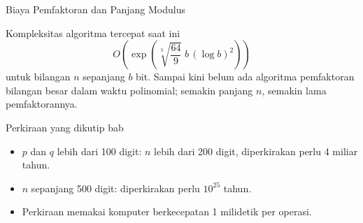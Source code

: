 \documentclass[aspectratio=169,11pt]{beamer}
\begin{document}
\begin{frame}{Biaya Pemfaktoran dan Panjang Modulus}
    \footnotesize
    \begin{block}{Kompleksitas algoritma tercepat saat ini}
        \[
            O\!\left(\exp\!\left(\sqrt[3]{\frac{64}{9}}\;
            b\,(\log b)^{2}\right)\right)
        \]
        untuk bilangan $n$ sepanjang $b$ bit. Sampai kini belum ada
        algoritma pemfaktoran bilangan besar dalam waktu polinomial;
        semakin panjang $n$, semakin lama pemfaktorannya.
    \end{block}
    \begin{exampleblock}{Perkiraan yang dikutip bab}
        \footnotesize
        \begin{itemize}
            \item $p$ dan $q$ lebih dari 100 digit: $n$ lebih dari 200
                  digit, diperkirakan perlu 4 miliar tahun.
            \item $n$ sepanjang 500 digit: diperkirakan perlu $10^{25}$
                  tahun.
            \item Perkiraan memakai komputer berkecepatan 1 milidetik per
                  operasi.
        \end{itemize}
    \end{exampleblock}
\end{frame}
\end{document}
